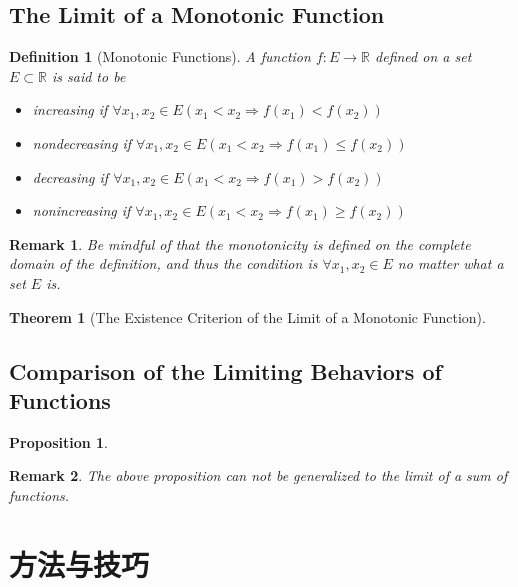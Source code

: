 \documentclass[onecolumn]{ctexart}
\newtheorem{definition}{Definition}
\newtheorem{theorem}{Theorem}
\newtheorem{proposition}{Proposition}
\newtheorem{remark}{Remark}
\begin{document}
\subsection{The Limit of a Monotonic Function}

\begin{definition}[Monotonic Functions]
  A function $f:E \to \mathbb{R}$ defined on a set $E \subset \mathbb{R}$ is 
  said to be
  \begin{itemize}
    \item increasing if $\forall x_1, x_2 \in E (x_1 < x_2 \Rightarrow f(x_1) < f(x_2))$
    \item nondecreasing if $\forall x_1, x_2 \in E (x_1 < x_2 \Rightarrow f(x_1) \leq f(x_2))$
    \item decreasing if $\forall x_1, x_2 \in E (x_1 < x_2 \Rightarrow f(x_1) > f(x_2))$
    \item nonincreasing if $\forall x_1, x_2 \in E (x_1 < x_2 \Rightarrow f(x_1) \geq f(x_2))$
  \end{itemize}
\end{definition}
\begin{remark}
  Be mindful of that the monotonicity is defined on the complete domain of the 
  definition, and thus the condition is $\forall x_1, x_2 \in E$ no matter what 
  a set $E$ is.
\end{remark}

\begin{theorem}[The Existence Criterion of the Limit of a Monotonic Function]
  
\end{theorem}

\subsection{Comparison of the Limiting Behaviors of Functions}

\begin{proposition}
  
\end{proposition}

\begin{remark}
  The above proposition can not be generalized to the limit of a sum of 
  functions.
\end{remark}

\section{方法与技巧}
\end{document}
